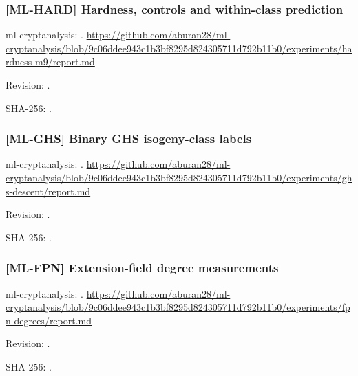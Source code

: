 \par\noindent\begin{minipage}{\linewidth}\small
\subsubsection*{[ML-HARD] Hardness, controls and within-class prediction}\label{art:ML-HARD}
ml-cryptanalysis: .
\url{https://github.com/aburan28/ml-cryptanalysis/blob/9c06ddee943c1b3bf8295d824305711d792b11b0/experiments/hardness-m9/report.md}
\par Revision: .
\par SHA-256: .
\end{minipage}\par\medskip

\par\noindent\begin{minipage}{\linewidth}\small
\subsubsection*{[ML-GHS] Binary GHS isogeny-class labels}\label{art:ML-GHS}
ml-cryptanalysis: .
\url{https://github.com/aburan28/ml-cryptanalysis/blob/9c06ddee943c1b3bf8295d824305711d792b11b0/experiments/ghs-descent/report.md}
\par Revision: .
\par SHA-256: .
\end{minipage}\par\medskip

\par\noindent\begin{minipage}{\linewidth}\small
\subsubsection*{[ML-FPN] Extension-field degree measurements}\label{art:ML-FPN}
ml-cryptanalysis: .
\url{https://github.com/aburan28/ml-cryptanalysis/blob/9c06ddee943c1b3bf8295d824305711d792b11b0/experiments/fpn-degrees/report.md}
\par Revision: .
\par SHA-256: .
\end{minipage}\par\medskip

